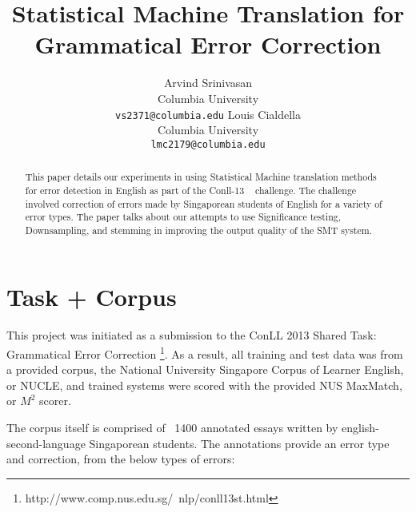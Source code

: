 \documentclass[11pt,letterpaper]{article}
\title{Statistical Machine Translation for Grammatical Error Correction}
\author{Arvind Srinivasan\\
	    Columbia University\\
	    {\tt vs2371@columbia.edu}
	  \And
	Louis Cialdella\\
  	Columbia University\\
  {\tt lmc2179@columbia.edu}}
\date{}
\begin{document}
\maketitle
\begin{abstract}
This paper details our experiments in using Statistical Machine translation methods for 
error detection in English as part of the Conll-13 ~\cite{CONLL} challenge. The challenge involved 
correction of errors made by Singaporean students of English for a variety of error types. 
The paper talks about our attempts to use Significance testing, Downsampling, and stemming in improving
the output quality of the SMT system.
\end{abstract}

\section{Task + Corpus}

This project was initiated as a submission to the ConLL 2013 Shared Task: Grammatical Error Correction \footnote{http://www.comp.nus.edu.sg/~nlp/conll13st.html}. As a result, all training and test data was from a provided corpus, the National University Singapore Corpus of Learner English, or NUCLE, and trained systems were scored with the provided NUS MaxMatch, or $M^2$ scorer. 

The corpus itself is comprised of ~1400 annotated essays written by english-second-language Singaporean students. The annotations provide an error type and correction, from the below types of errors:
\end{document}
